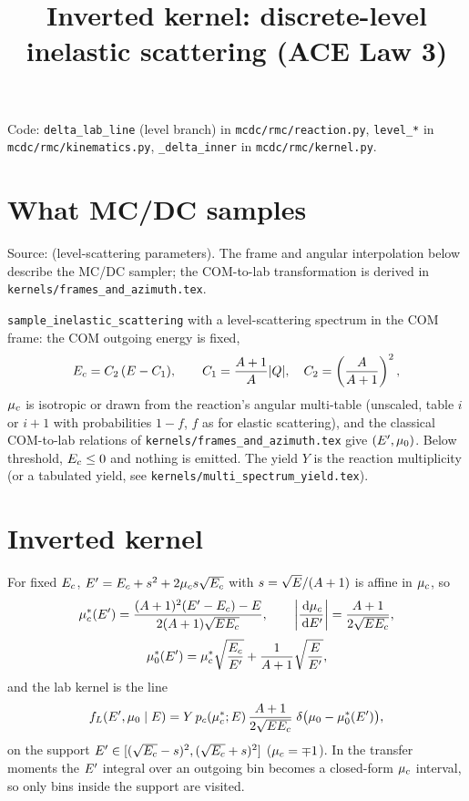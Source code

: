 \documentclass[11pt]{article}
\title{Inverted kernel: discrete-level inelastic scattering (ACE Law 3)}
\date{}
\begin{document}
\maketitle

\noindent Code: \texttt{delta\_lab\_line} (level branch) in
\texttt{mcdc/rmc/reaction.py}, \texttt{level\_*} in \texttt{mcdc/rmc/kinematics.py},
\texttt{\_delta\_inner} in \texttt{mcdc/rmc/kernel.py}.

\section{What MC/DC samples}

\noindent Source:  (level-scattering parameters).
The frame and angular interpolation below describe the MC/DC sampler; the
COM-to-lab transformation is derived in \texttt{kernels/frames\_and\_azimuth.tex}.

\texttt{sample\_inelastic\_scattering} with a level-scattering spectrum in the COM
frame: the COM outgoing energy is fixed,
\begin{equation}
  E_{c} = C_2\,(E - C_1),\qquad C_1 = \frac{A+1}{A}|Q|,\quad C_2 = \left(\frac{A}{A+1}\right)^2 ,
\end{equation}
$\mu_{c}$ is isotropic or drawn from the reaction's angular multi-table (unscaled,
table $i$ or $i+1$ with probabilities $1-f$, $f$ as for elastic scattering), and the
classical COM-to-lab relations of \texttt{kernels/frames\_and\_azimuth.tex} give
$(E', \mu_0)$. Below threshold, $E_{c} \le 0$ and nothing is emitted. The yield $Y$
is the reaction multiplicity (or a tabulated yield, see
\texttt{kernels/multi\_spectrum\_yield.tex}).

\section{Inverted kernel}

For fixed $E_{c}$, $E' = E_{c} + s^2 + 2\mu_{c} s\sqrt{E_{c}}$ with $s = \sqrt{E}/(A+1)$
is affine in $\mu_{c}$, so
\begin{equation}
  \mu_{c}^*(E') = \frac{(A+1)^2(E' - E_{c}) - E}{2(A+1)\sqrt{EE_{c}}},\qquad
  \left|\frac{\,\mathrm{d}\mu_{c}}{\,\mathrm{d}E'}\right| = \frac{A+1}{2\sqrt{EE_{c}}},
\end{equation}
\begin{equation}
  \mu_0^*(E') = \mu_{c}^*\sqrt{\frac{E_{c}}{E'}} + \frac{1}{A+1}\sqrt{\frac{E}{E'}},
\end{equation}
and the lab kernel is the line
\begin{equation}
  f_L(E', \mu_0 \mid E) = Y\,p_c(\mu_{c}^*; E)\,\frac{A+1}{2\sqrt{EE_{c}}}\;
  \delta\big(\mu_0 - \mu_0^*(E')\big),
\end{equation}
on the support $E' \in [(\sqrt{E_{c}} - s)^2, (\sqrt{E_{c}} + s)^2]$ ($\mu_{c} = \mp1$).
In the transfer moments the $E'$ integral over an outgoing bin becomes a closed-form
$\mu_{c}$ interval, so only bins inside the support are visited.
\end{document}
